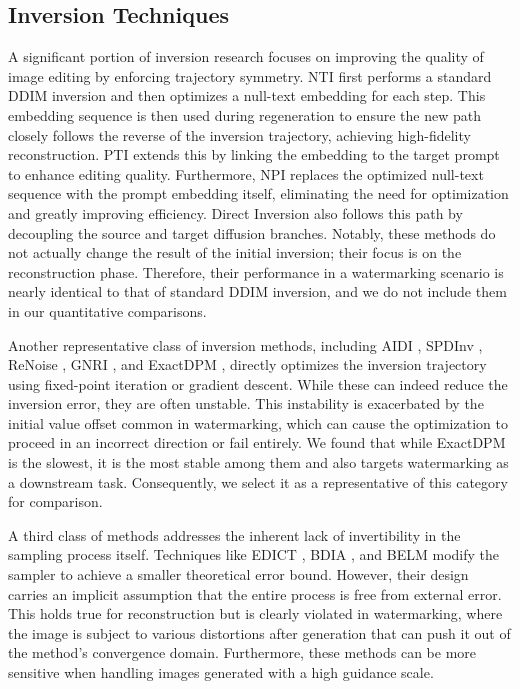 \documentclass{article}
\begin{document}
\subsection{Inversion Techniques}
A significant portion of inversion research focuses on improving the quality of image editing by enforcing trajectory symmetry. NTI \citep{nti2023} first performs a standard DDIM inversion and then optimizes a null-text embedding for each step. This embedding sequence is then used during regeneration to ensure the new path closely follows the reverse of the inversion trajectory, achieving high-fidelity reconstruction. PTI \citep{pti2023} extends this by linking the embedding to the target prompt to enhance editing quality. Furthermore, NPI \citep{npi2025} replaces the optimized null-text sequence with the prompt embedding itself, eliminating the need for optimization and greatly improving efficiency. Direct Inversion \citep{directinv2023} also follows this path by decoupling the source and target diffusion branches. Notably, these methods do not actually change the result of the initial inversion; their focus is on the reconstruction phase. Therefore, their performance in a watermarking scenario is nearly identical to that of standard DDIM inversion, and we do not include them in our quantitative comparisons.

Another representative class of inversion methods, including AIDI \citep{aidi2023}, SPDInv \citep{spdinv2024}, ReNoise \citep{renoise2024}, GNRI \citep{lightning2023}, and ExactDPM \citep{exactdpm2024}, directly optimizes the inversion trajectory using fixed-point iteration or gradient descent. While these can indeed reduce the inversion error, they are often unstable. This instability is exacerbated by the initial value offset common in watermarking, which can cause the optimization to proceed in an incorrect direction or fail entirely. We found that while ExactDPM is the slowest, it is the most stable among them and also targets watermarking as a downstream task. Consequently, we select it as a representative of this category for comparison.

A third class of methods addresses the inherent lack of invertibility in the sampling process itself. Techniques like EDICT \citep{edict2023}, BDIA \citep{bdia2024}, and BELM \citep{belm2024} modify the sampler to achieve a smaller theoretical error bound.  However, their design carries an implicit assumption that the entire process is free from external error. This holds true for reconstruction but is clearly violated in watermarking, where the image is subject to various distortions after generation that can push it out of the method's convergence domain. Furthermore, these methods can be more sensitive when handling images generated with a high guidance scale.
\end{document}
